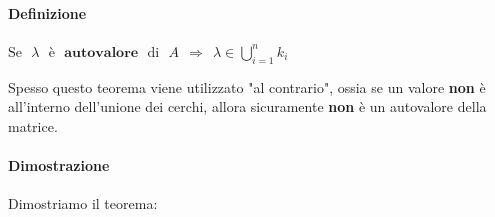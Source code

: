 \documentclass{article}
\begin{document}
\paragraph{Definizione} $\boxed{\text{Se} \: \: \: \lambda \: \: \: \text{è} \: \: \: \textbf{autovalore} \: \: \: \text{di} \: \: \: A \: \:\Rightarrow \: \: \lambda \in \bigcup_{i=1}^{n}k_{i}} $

\vspace*{12px}

Spesso questo teorema viene utilizzato "al contrario", ossia se un valore \textbf{non} è all'interno dell'unione dei cerchi, allora sicuramente \textbf{non} è un autovalore della matrice.

\paragraph{Dimostrazione} Dimostriamo il teorema:
\end{document}
